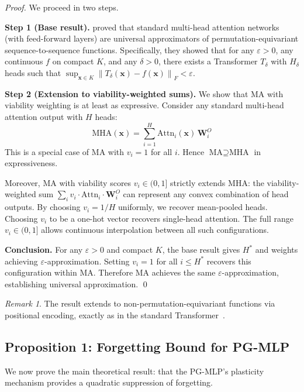 \documentclass[11pt,a4paper]{article}
\theoremstyle{plain}
\theoremstyle{definition}
\theoremstyle{remark}
\newtheorem{remark}{Remark}
\newcommand{\norm}[1]{\left\lVert #1 \right\rVert}
\begin{document}
\begin{proof}
We proceed in two steps.

\textbf{Step 1 (Base result).}
\citet{yun2020} proved that standard multi-head attention networks (with feed-forward layers) are universal approximators of permutation-equivariant sequence-to-sequence functions. Specifically, they showed that for any $\varepsilon > 0$, any continuous $f$ on compact $K$, and any $\delta > 0$, there exists a Transformer $T_\delta$ with $H_\delta$ heads such that $\sup_{\mathbf{x} \in K}\norm{T_\delta(\mathbf{x}) - f(\mathbf{x})}_F < \varepsilon$.

\textbf{Step 2 (Extension to viability-weighted sums).}
We show that MA with viability weighting is at least as expressive. Consider any standard multi-head attention output with $H$ heads:
\[
  \text{MHA}(\mathbf{x}) = \sum_{i=1}^H \text{Attn}_i(\mathbf{x})\,\mathbf{W}_i^O
\]
This is a special case of MA with $v_i = 1$ for all $i$. Hence $\text{MA} \supseteq \text{MHA}$ in expressiveness.

Moreover, MA with viability scores $v_i \in (0,1]$ strictly extends MHA: the viability-weighted sum $\sum_i v_i \cdot \text{Attn}_i \cdot \mathbf{W}_i^O$ can represent any convex combination of head outputs. By choosing $v_i = 1/H$ uniformly, we recover mean-pooled heads. Choosing $v_i$ to be a one-hot vector recovers single-head attention. The full range $v_i \in (0,1]$ allows continuous interpolation between all such configurations.

\textbf{Conclusion.}
For any $\varepsilon > 0$ and compact $K$, the base result gives $H^*$ and weights achieving $\varepsilon$-approximation. Setting $v_i = 1$ for all $i \leq H^*$ recovers this configuration within MA. Therefore MA achieves the same $\varepsilon$-approximation, establishing universal approximation. \qed
\end{proof}

\begin{remark}
The result extends to non-permutation-equivariant functions via positional encoding, exactly as in the standard Transformer~\citep{yun2020}.
\end{remark}

\subsection{Proposition 1: Forgetting Bound for PG-MLP}

We now prove the main theoretical result: that the PG-MLP's plasticity mechanism provides a quadratic suppression of forgetting.
\end{document}

